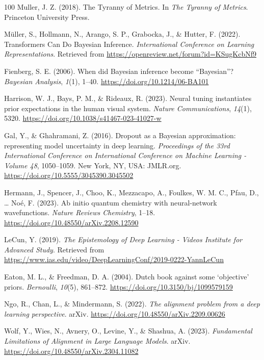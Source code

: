 \documentclass[11pt]{book}
\begin{document}
\begin{thebibliography}{100}
 Muller, J. Z. (2018). The Tyranny of Metrics. In \emph{The Tyranny of
Metrics}. Princeton University Press.

 Müller, S., Hollmann, N., Arango, S. P., Grabocka, J., \& Hutter, F.
(2022). Transformers Can Do Bayesian Inference. \emph{International
Conference on Learning Representations}. Retrieved from
\url{https://openreview.net/forum?id=KSugKcbNf9}

 Fienberg, S. E. (2006). When did Bayesian inference become
{``Bayesian''}? \emph{Bayesian Analysis}, \emph{1}(1), 1--40.
\url{https://doi.org/10.1214/06-BA101}

 Harrison, W. J., Bays, P. M., \& Rideaux, R. (2023). Neural tuning
instantiates prior expectations in the human visual system. \emph{Nature
Communications}, \emph{14}(1), 5320.
\url{https://doi.org/10.1038/s41467-023-41027-w}

 Gal, Y., \& Ghahramani, Z. (2016). Dropout as a Bayesian approximation:
representing model uncertainty in deep learning. \emph{Proceedings of
the 33rd International Conference on International Conference on Machine
Learning - Volume 48}, 1050--1059. New York, NY, USA: JMLR.org.
\url{https://doi.org/10.5555/3045390.3045502}

 Hermann, J., Spencer, J., Choo, K., Mezzacapo, A., Foulkes, W. M. C.,
Pfau, D., \ldots{} Noé, F. (2023). Ab initio quantum chemistry with
neural-network wavefunctions. \emph{Nature Reviews Chemistry}, 1--18.
\url{https://doi.org/10.48550/arXiv.2208.12590}

 LeCun, Y. (2019). \emph{The Epistemology of Deep Learning - Videos
\textbar{} Institute for Advanced Study}. Retrieved from
\url{https://www.ias.edu/video/DeepLearningConf/2019-0222-YannLeCun}

 Eaton, M. L., \& Freedman, D. A. (2004). Dutch book against some
`objective' priors. \emph{Bernoulli}, \emph{10}(5), 861--872.
\url{https://doi.org/10.3150/bj/1099579159}

 Ngo, R., Chan, L., \& Mindermann, S. (2022). \emph{The alignment problem
from a deep learning perspective}. arXiv.
\url{https://doi.org/10.48550/arXiv.2209.00626}

 Wolf, Y., Wies, N., Avnery, O., Levine, Y., \& Shashua, A. (2023).
\emph{Fundamental Limitations of Alignment in Large Language Models}.
arXiv. \url{https://doi.org/10.48550/arXiv.2304.11082}


\end{thebibliography}
\end{document}
